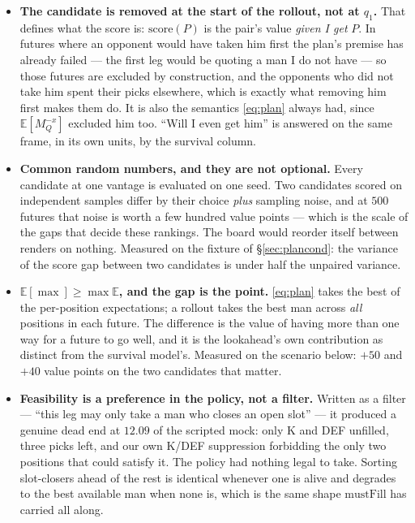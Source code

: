 \documentclass[10pt,a4paper]{article}
\theoremstyle{plain}
\theoremstyle{definition}
\theoremstyle{remark}
\begin{document}
\begin{itemize}
\item \textbf{The candidate is removed at the start of the rollout, not at $q_1$.} That
defines what the score is: $\mathrm{score}(P)$ is the pair's value \emph{given I get} $P$.
In futures where an opponent would have taken him first the plan's premise has already
failed --- the first leg would be quoting a man I do not have --- so those futures are
excluded by construction, and the opponents who did not take him spent their picks
elsewhere, which is exactly what removing him first makes them do. It is also the
semantics \eqref{eq:plan} always had, since $\mathbb{E}[M_Q^{-x}]$ excluded him too.
``Will I even get him'' is answered on the same frame, in its own units, by the survival
column.

\item \textbf{Common random numbers, and they are not optional.} Every candidate at one
vantage is evaluated on one seed. Two candidates scored on independent samples differ by
their choice \emph{plus} sampling noise, and at $500$ futures that noise is worth a few
hundred value points --- which is the scale of the gaps that decide these rankings. The
board would reorder itself between renders on nothing. Measured on the fixture of
\S\ref{sec:plancond}: the variance of the score gap between two candidates is under half
the unpaired variance.

\item \textbf{$\mathbb{E}[\max] \ge \max \mathbb{E}$, and the gap is the point.}
\eqref{eq:plan} takes the best of the per-position expectations; a rollout takes the best
man across \emph{all} positions in each future. The difference is the value of having
more than one way for a future to go well, and it is the lookahead's own contribution as
distinct from the survival model's. Measured on the scenario below: $+50$ and $+40$ value
points on the two candidates that matter.

\item \textbf{Feasibility is a preference in the policy, not a filter.} Written as a
filter --- ``this leg may only take a man who closes an open slot'' --- it produced a
genuine dead end at $12.09$ of the scripted mock: only K and DEF unfilled, three picks
left, and our own K/DEF suppression forbidding the only two positions that could satisfy
it. The policy had nothing legal to take. Sorting slot-closers ahead of the rest is
identical whenever one is alive and degrades to the best available man when none is,
which is the same shape $\mathrm{mustFill}$ has carried all along.


\end{itemize}
\end{document}
